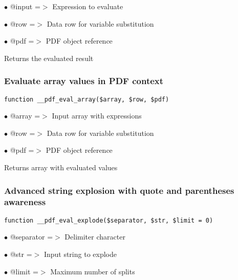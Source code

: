 \documentclass[a4paper]{article}
\begin{document}
\begin{compactitem}
\item[\color{myblue}$\bullet$] @input =$>$ Expression to evaluate
\item[\color{myblue}$\bullet$] @row   =$>$ Data row for variable substitution
\item[\color{myblue}$\bullet$] @pdf   =$>$ PDF object reference
\end{compactitem}

Returns the evaluated result

\hypertarget{toc511}{}
\subsubsection{Evaluate array values in PDF context}

\begin{lstlisting}
function __pdf_eval_array($array, $row, $pdf)
\end{lstlisting}

\begin{compactitem}
\item[\color{myblue}$\bullet$] @array =$>$ Input array with expressions
\item[\color{myblue}$\bullet$] @row   =$>$ Data row for variable substitution
\item[\color{myblue}$\bullet$] @pdf   =$>$ PDF object reference
\end{compactitem}

Returns array with evaluated values

\hypertarget{toc512}{}
\subsubsection{Advanced string explosion with quote and parentheses awareness}

\begin{lstlisting}
function __pdf_eval_explode($separator, $str, $limit = 0)
\end{lstlisting}

\begin{compactitem}
\item[\color{myblue}$\bullet$] @separator =$>$ Delimiter character
\item[\color{myblue}$\bullet$] @str       =$>$ Input string to explode
\item[\color{myblue}$\bullet$] @limit     =$>$ Maximum number of splits
\end{compactitem}
\end{document}
